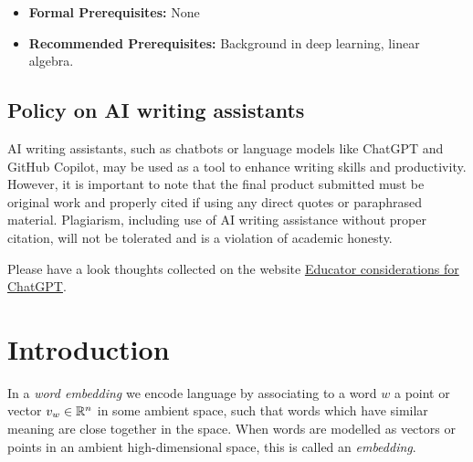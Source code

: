 \documentclass[11pt, a4paper]{amsart}
\begin{document}
\begin{itemize}
\begin{itemize}
\begin{itemize}
        \end{itemize}
        \item Submission of a  \LaTeX-file and compiled PDF of an extended abstract:
        \begin{itemize}
        	\item No more than 2 pages.
        	\item Using the \href{https://www.overleaf.com/latex/templates/acl-2020-proceedings-template/zsrkcwjptpcd}{ACL Overleaf template}.
        	\item Including relevant references to scientific literature.
        \end{itemize}
    \end{itemize}
    \item \textbf{Formal Prerequisites:} None
    \item \textbf{Recommended Prerequisites:}
    Background in deep learning,
    linear algebra.
\end{itemize}

\subsection*{Policy on AI writing assistants}

AI writing assistants, such as chatbots or language models like ChatGPT \cite{ChatGPT} and GitHub Copilot, may be used as a tool to enhance writing skills and productivity.
However, it is important to note that the final product submitted must be original work and properly cited if using any direct quotes or paraphrased material.
Plagiarism, including use of AI writing assistance without proper citation, will not be tolerated and is a violation of academic honesty.

Please have a look thoughts collected on the website \href{https://platform.openai.com/docs/chatgpt-education}{Educator considerations for ChatGPT}.

\clearpage
\section{Introduction}
\label{sec:intro}

In a \emph{word embedding} we encode language by associating to a word $w$ a point or vector $v_{w} \in \mathbb{R}^{n}$ in some ambient space, such that words which have similar meaning are close together in the space.
When words are modelled as vectors or points in an ambient high-dimensional space, this is called an \emph{embedding}.
\end{document}
